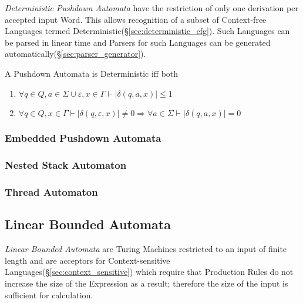 \emph{Deterministic Pushdown Automata} have the restriction of only
one derivation per accepted input Word. This allows recognition of a
subset of Context-free Languages termed
Deterministic(\S\ref{sec:deterministic_cfg}). Such Languages can be
parsed in linear time and Parsers for such Languages can be generated
automatically(\S\ref{sec:parser_generator}).

A Pushdown Automata is Deterministic iff both
\begin{enumerate}
\item $\forall q \in Q, a \in \Sigma \cup {\varepsilon}, x \in
  \Gamma \vdash |\delta(q,a,x)| \leq 1$
\item $\forall q \in Q, x \in \Gamma \vdash |\delta(q,\varepsilon,x)|
  \neq 0 \Rightarrow \forall a \in \Sigma \vdash |\delta(q,a,x)|=0$
\end{enumerate}



\subsubsection{Embedded Pushdown Automata}\label{sec:embedded_pushdown}

\subsubsection{Nested Stack Automaton}\label{sec:nested_stack_automaton}

\subsubsection{Thread Automaton}\label{sec:thread_automaton}



\subsection{Linear Bounded Automata} \label{sec:linear_bounded_automata}

\emph{Linear Bounded Automata} are Turing Machines restricted to an
input of finite length and are acceptors for Context-sensitive
Languages(\S\ref{sec:context_sensitive}) which require that
Production Rules do not increase the size of the Expression as a
result; therefore the size of the input is sufficient for calculation.



